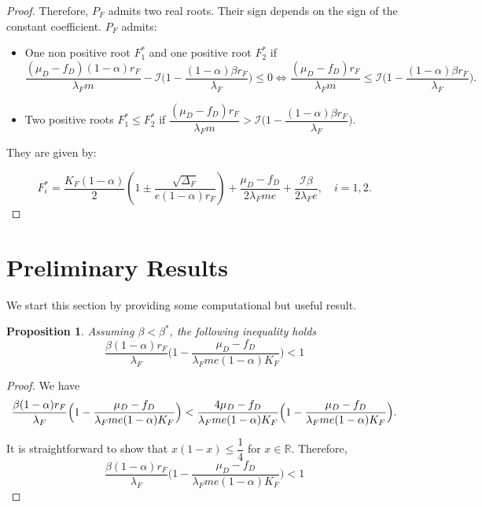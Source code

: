 \documentclass{article}
\newcommand{\lfw}{\lambda_{F}}
\newcommand{\lfw}{\lambda_{F}}
\newcommand{\cI}{\mathcal{I}}
\newtheorem{prop}{Proposition}
\begin{document}
\begin{appendix}
\begin{proof}
Therefore, $P_F$ admits two real roots. Their sign depends on the sign of the constant coefficient. $P_F$ admits:
\begin{itemize}
\item One non positive root $F^*_1$ and one positive root $F^*_2$ if $$\dfrac{(\mu_D - f_D)(1-\alpha) r_F}{\lfw m} - \cI\Big(1 - \dfrac{(1-\alpha)\beta r_F}{\lfw} \Big) \leq 0 \Leftrightarrow \dfrac{(\mu_D - f_D) r_F}{\lfw m } \leq \cI\Big(1 - \dfrac{(1-\alpha)\beta r_F}{\lfw} \Big).$$
\item Two positive roots $F^*_1\leq  F^*_2$ if $\dfrac{(\mu_D - f_D) r_F}{\lfw m } > \cI\Big(1 - \dfrac{(1-\alpha)\beta r_F}{\lfw} \Big)$.
\end{itemize}
They are given by:

\begin{equation*}
F_i^* = \dfrac{K_F(1-\alpha)}{2}\left(1 \pm \dfrac{\sqrt{\Delta_F}}{e(1-\alpha)r_F}\right) + \dfrac{\mu_D - f_D}{2\lfw m e} + \dfrac{\cI \beta}{2\lfw e}, \quad i=1,2.
\end{equation*}
\end{proof}


\end{appendix}



\section{Preliminary Results}

We start this section by providing some computational but useful result.

\begin{prop} \label{propBeta}
Assuming $\beta < \beta^*$, the following inequality holds
$$
\dfrac{\beta (1-\alpha) r_F}{\lfw} \Big(1 - \dfrac{\mu_D - f_D}{\lfw m e (1-\alpha) K_F}\Big) < 1
$$
\end{prop}

\begin{proof}
We have
\begin{equation*}
\dfrac{\beta (1-\alpha) r_F}{\lfw} \Big(1 - \dfrac{\mu_D - f_D}{\lfw m e (1-\alpha) K_F}\Big) < \dfrac{4 \mu_D - f_D}{\lfw m e (1-\alpha) K_F} \Big(1 - \dfrac{\mu_D - f_D}{\lfw m e (1-\alpha) K_F}\Big).\\
\end{equation*}

It is straightforward to show that $x(1 - x) \leq \dfrac{1}{4}$ for $x \in \mathbb{R}$. Therefore,
\begin{equation*}
\dfrac{\beta (1-\alpha) r_F}{\lfw} \Big(1 - \dfrac{\mu_D - f_D}{\lfw m e (1-\alpha) K_F}\Big) <  1
\end{equation*}
\end{proof}
\end{document}
